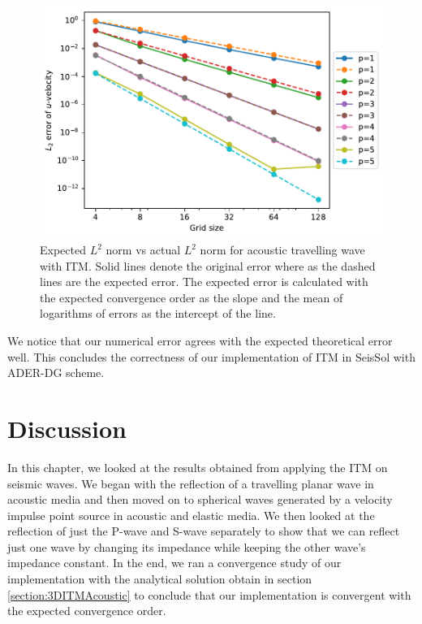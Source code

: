 \begin{figure}[!htpb]
    \centering
    \includegraphics[width=0.75\linewidth]{figures/error3.pdf}
    \caption{Expected $L^2$ norm vs actual $L^2$ norm for acoustic travelling wave with \ac{ITM}. Solid lines denote the original error where as the dashed lines are the expected error. The expected error is calculated with the expected convergence order
    as the slope and the mean of logarithms of errors as the intercept of the line.}
    \label{fig:expectedvsactualerror}
\end{figure}

We notice that our numerical error agrees with the expected theoretical error well. This concludes the correctness of our implementation of \ac{ITM} in SeisSol with \ac{ADER}-\ac{DG} scheme.

\section{Discussion}
In this chapter, we looked at the results obtained from applying the \ac{ITM} on seismic waves. We began with the reflection of a travelling planar wave in acoustic media
and then moved on to spherical waves generated by a velocity impulse point source in acoustic and elastic media. 
We then looked at the reflection of just the P-wave and S-wave separately to show that we can reflect just one wave by changing its impedance while keeping the other wave's impedance constant.
In the end, we ran a convergence study of our implementation with the analytical solution obtain in section \ref{section:3DITMAcoustic} to conclude that our implementation
is convergent with the expected convergence order. \\